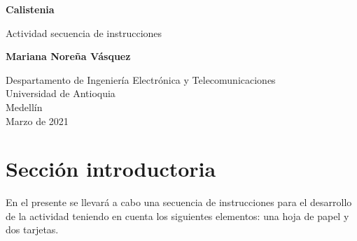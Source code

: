 \documentclass{article}
\begin{document}
\begin{titlepage}
    \begin{center}
        \vspace*{1cm}
            
        \Huge
        \textbf{Calistenia}
            
        \vspace{0.5cm}
        \LARGE
        Actividad secuencia de instrucciones
            
        \vspace{1.5cm}
            
        \textbf{Mariana Noreña Vásquez}
            
        \vfill
            
        \vspace{0.8cm}
            
        \Large
        Despartamento de Ingeniería Electrónica y Telecomunicaciones\\
        Universidad de Antioquia\\
        Medellín\\
        Marzo de 2021
            
    \end{center}
\end{titlepage}

\tableofcontents
\newpage
\section{Sección introductoria}\label{intro}
En el presente se llevará a cabo una secuencia de instrucciones para el desarrollo de la actividad teniendo en cuenta los siguientes elementos: una hoja de papel y dos tarjetas.
\end{document}
